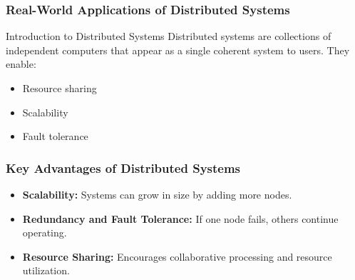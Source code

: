 \documentclass[aspectratio=169]{beamer}
\begin{document}
\begin{frame}[fragile]
    \frametitle{Real-World Applications of Distributed Systems}
    \begin{block}{Introduction to Distributed Systems}
        Distributed systems are collections of independent computers that appear as a single coherent system to users. They enable:
        \begin{itemize}
            \item Resource sharing
            \item Scalability
            \item Fault tolerance
        \end{itemize}
    \end{block}
\end{frame}

\begin{frame}[fragile]
    \frametitle{Key Advantages of Distributed Systems}
    \begin{itemize}
        \item \textbf{Scalability:} Systems can grow in size by adding more nodes.
        \item \textbf{Redundancy and Fault Tolerance:} If one node fails, others continue operating.
        \item \textbf{Resource Sharing:} Encourages collaborative processing and resource utilization.
    \end{itemize}
\end{frame}
\end{document}
